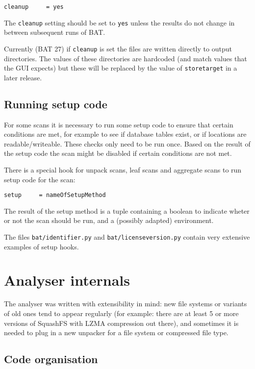 \documentclass[10pt,a4paper]{article}
\begin{document}
\begin{verbatim}
cleanup     = yes
\end{verbatim}

The \texttt{cleanup} setting should be set to \texttt{yes} unless the results
do not change in between subsequent runs of BAT.

Currently (BAT 27) if \texttt{cleanup} is set the files are written directly to
output directories. The values of these directories are hardcoded (and match
values that the GUI expects) but these will be replaced by the value of
\texttt{storetarget} in a later release.

\subsection{Running setup code}

For some scans it is necessary to run some setup code to ensure that certain
conditions are met, for example to see if database tables exist, or if locations
are readable/writeable. These checks only need to be run once. Based on the
result of the setup code the scan might be disabled if certain conditions are
not met.

There is a special hook for unpack scans, leaf scans and aggregate scans to run
setup code for the scan:

\begin{verbatim}
setup     = nameOfSetupMethod
\end{verbatim}

The result of the setup method is a tuple containing a boolean to indicate
wheter or not the scan should be run, and a (possibly adapted) environment.

The files \texttt{bat/identifier.py} and \texttt{bat/licenseversion.py} contain
very extensive examples of setup hooks.

\section{Analyser internals}

The analyser was written with extensibility in mind: new file systems or
variants of old ones tend to appear regularly (for example: there are at
least 5 or more versions of SquashFS with LZMA compression out there), and
sometimes it is needed to plug in a new unpacker for a file system or
compressed file type.

\subsection{Code organisation}
\end{document}
